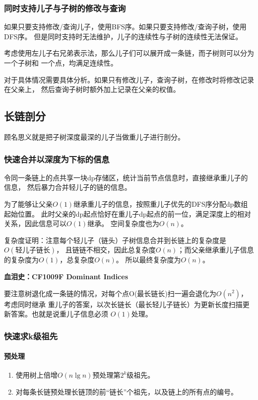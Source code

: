 \subsubsection{同时支持儿子与子树的修改与查询}
如果只要支持修改/查询儿子，使用BFS序。如果只要支持修改/查询子树，使用DFS序。
但是同时支持时无法维护，儿子的连续性与子树的连续性无法保证。

考虑使用左儿子右兄弟表示法，那么儿子们可以展开成一条链，而子树则可以分为一个子树和
一个点，均满足连续性。

对于具体情况需要具体分析。如果只有修改儿子，查询子树，在修改时将修改记录在父亲上，
然后查询子树时额外加上记录在父亲的权值。
\subsection{长链剖分}
顾名思义就是把子树深度最深的儿子当做重儿子进行剖分。

\subsubsection{快速合并以深度为下标的信息}
令同一条链上的点共享一块dp存储区，统计当前节点信息时，直接继承重儿子的信息，
然后暴力合并轻儿子的链的信息。

为了能够让父亲$O(1)$继承重儿子的信息，按照重儿子优先的DFS序分配dp数组起始位置。
此时父亲的dp起点恰好在重儿子dp起点的前一位，满足深度上的相对关系，因此信息可以$O(1)$继承。
空间复杂度也为$O(n)$。

复杂度证明：注意每个轻儿子（链头）子树信息合并到长链上的复杂度是\\$O(\textrm{轻儿子链长})$，
且链链不相交，因此总复杂度$O(n)$；而父亲继承重儿子信息的复杂度为$O(1)$，总复杂度$O(n)$。
所以最终复杂度为$O(n)$。

{\bfseries
血泪史：CF1009F Dominant Indices

要注意树退化成一条链的情况，对每个点O(最长链长)扫一遍会退化为$O(n^2)$，考虑同时继承
重儿子的答案，以次长链长（最长轻儿子链长）为更新长度扫描更新答案。也就是说重儿子信息必须
$O(1)$处理。}



\subsubsection{快速求k级祖先}
\paragraph{预处理}
\begin{enumerate}
	\item 使用树上倍增$O(n\lg n)$预处理第$2^k$级祖先。
	\item 对每条长链预处理长链顶的前``链长''个祖先，以及链上的所有点的编号。
\end{enumerate}

